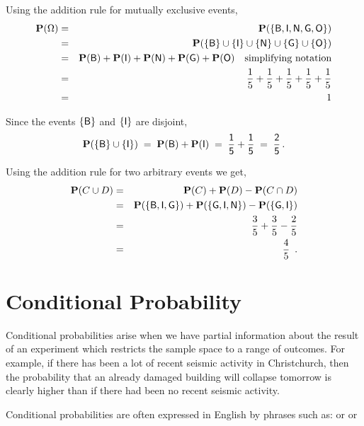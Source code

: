 \begin{ExerciseList}

Using the addition rule for mutually exclusive events,
\begin{eqnarray*}
\mathbf{P}(\Omega)
&=& \mathbf{P}(\mathsf{\{B,I,N,G,O\}})\\
&=& \mathbf{P}(\{\sf{B}\} \cup\{\sf{I}\}\cup \{\sf{N}\} \cup \{\sf{G}\} \cup \{\sf{O}\})\\
&=& \mathbf{P}(\sf B)+\mathbf{P}(\sf I)+\mathbf{P}(\sf N)+\mathbf{P}(\sf G)+\mathbf{P}(\sf O) \quad \text{simplifying notation} \\
&=& \frac{1}{5}+\frac{1}{5}+\frac{1}{5}+\frac{1}{5}+\frac{1}{5}\\
&=& 1
\end{eqnarray*}

\item Since the   events $\{\sf B\}$ and $\{\sf I\}$ are disjoint,
$$
\mathbf{P}(\{\sf{B}\} \cup \{\sf{I}\})\;=\;\mathbf{P}(\sf B)+\mathbf{P}(\sf I)\;=\;\frac{1}{5}+\frac{1}{5}\;=\;\frac{2}{5}\,.
$$


\medskip


\item  Using the addition rule for two arbitrary events we get,
\begin{eqnarray*}
\mathbf{P}(C \cup D) &=& \mathbf{P}(C)+\mathbf{P}(D)-\mathbf{P}(C\cap D)\\& =& \mathbf{P}(\{\sf{B},\sf{I},\sf{G}\}) + \mathbf{P}(\{\sf{G},\sf{I},\sf{N}\}) - \mathbf{P}(\{\sf{G},\sf{I}\})\\
& =& \frac{3}{5} +\frac{3}{5} - \frac{2}{5}\\& = &\frac{4}{5} \enspace .
\end{eqnarray*}
\ee


\end{ExerciseList}



\section{Conditional Probability}\label{S:CondProb}

Conditional probabilities arise when we have partial information about
the result of an  experiment which restricts the sample space to a range
of outcomes.  For example, if there has been a lot of recent seismic activity
in Christchurch, then the probability that an already damaged building will
collapse tomorrow is clearly higher than if there had been no recent seismic activity.

Conditional probabilities are  often
expressed in English by phrases such as: or  or 

